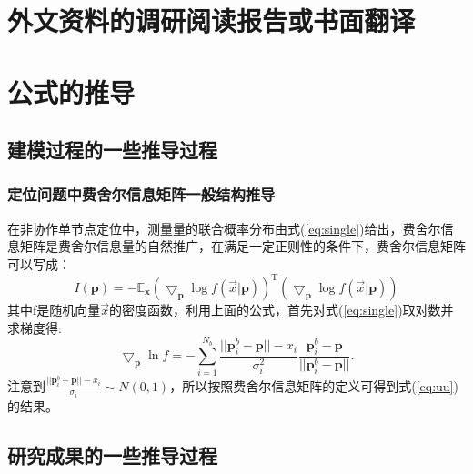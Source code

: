 \chapter{外文资料的调研阅读报告或书面翻译}

\chapter{公式的推导}
\section{建模过程的一些推导过程}
\subsection{定位问题中费舍尔信息矩阵一般结构推导}\label{A_F_1}
在非协作单节点定位中，测量量的联合概率分布由式(\ref{eq:single})给出，费舍尔信息矩阵是费舍尔信息量的自然推广，在满足一定正则性的条件下，费舍尔信息矩阵可以写成：
\begin{equation}
I(\bm{p})=-\mathbb{E}_{\bm{x}}(\bigtriangledown_{\bm{p}} \log f(\vec{x}|\bm{p}))^{\textrm{T}}(\bigtriangledown_{\bm{p}} \log f(\vec{x}|\bm{p}))
\end{equation}
其中f是随机向量$\vec{x}$的密度函数，利用上面的公式，首先对式(\ref{eq:single})取对数并求梯度得:
\begin{equation}
\bigtriangledown_{\bm{p}}\ln f=-\sum_{i=1}^{N_b}\frac{||\bm{p}_i^b-\bm{p}||-x_i}{\sigma_i^2}\frac{\bm{p}^b_i-\bm{p}}{||\bm{p}^b_i-\bm{p}||}.
\end{equation}
注意到$\frac{||\bm{p}_i^b-\bm{p}||-x_i}{\sigma_i}\sim N(0,1)$，所以按照费舍尔信息矩阵的定义可得到式(\ref{eq:uu})的结果。
\section{研究成果的一些推导过程}
